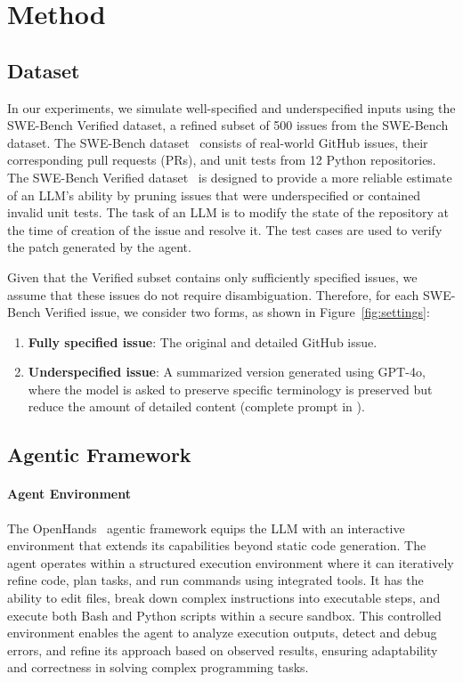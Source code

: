 \section{Method}
\label{sec:Method}


\subsection{Dataset}
In our experiments, we simulate well-specified and underspecified inputs using the SWE-Bench Verified dataset, a refined subset of 500 issues from the SWE-Bench dataset. The SWE-Bench dataset~\cite{jimenez2024swebenchlanguagemodelsresolve} consists of real-world GitHub issues, their corresponding pull requests (PRs), and unit tests from 12 Python repositories. The SWE-Bench Verified dataset~\cite{SWE_Bench_Verified} is designed to provide a more reliable estimate of an LLM's ability by pruning issues that were underspecified or contained invalid unit tests. The task of an LLM is to modify the state of the repository at the time of creation of the issue and resolve it. The test cases are used to verify the patch generated by the agent. 

Given that the Verified subset contains only sufficiently specified issues, we assume that these issues do not require disambiguation. Therefore, for each SWE-Bench Verified issue, we consider two forms, as shown in Figure~\ref{fig:settings}:

\begin{enumerate}[itemsep=0pt, topsep=0pt]
    \item \textbf{Fully specified issue}: The original and detailed GitHub issue.
    \item \textbf{Underspecified issue}: A summarized version generated using GPT-4o, where the model is asked to preserve specific terminology is preserved but reduce the amount of detailed content (complete prompt in ).
\end{enumerate}
\vspace{-8pt}
\subsection{Agentic Framework}
\paragraph{Agent Environment} The OpenHands~\cite{wang2024openhandsopenplatformai} agentic framework equips the LLM with an interactive environment that extends its capabilities beyond static code generation. The agent operates within a structured execution environment where it can iteratively refine code, plan tasks, and run commands using integrated tools. It has the ability to edit files, break down complex instructions into executable steps, and execute both Bash and Python scripts within a secure sandbox. This controlled environment enables the agent to analyze execution outputs, detect and debug errors, and refine its approach based on observed results, ensuring adaptability and correctness in solving complex programming tasks.

